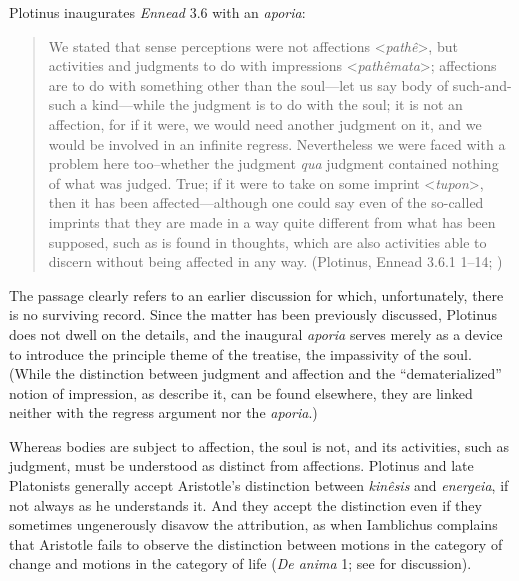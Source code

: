 \documentclass[12pt]{article}
\begin{document}
Plotinus inaugurates \emph{Ennead} 3.6 with an \emph{aporia}:
\begin{quote}
	We stated that sense perceptions were not affections <\emph{pathê}>, but activities and judgments to do with impressions <\emph{pathêmata}>; affections are to do with something other than the soul---let us say body of such-and-such a kind---while the judgment is to do with the soul; it is not an affection, for if it were, we would need another judgment on it, and we would be involved in an infinite regress. Nevertheless we were faced with a problem here too--whether the judgment \emph{qua} judgment contained nothing of what was judged. True; if it were to take on some imprint <\emph{tupon}>, then it has been affected---although one could say even of the so-called imprints that they are made in a way quite different from what has been supposed, such as is found in thoughts, which are also activities able to discern without being affected in any way. (Plotinus, Ennead 3.6.1 1--14; \citealt[3]{Fleet:1995gf})
\end{quote}
The passage clearly refers to an earlier discussion for which, unfortunately, there is no surviving record. Since the matter has been previously discussed, Plotinus does not dwell on the details, and the inaugural \emph{aporia} serves merely as a device to introduce the principle theme of the treatise, the impassivity of the soul. (While the distinction between judgment and affection and the ``dematerialized'' notion of impression, as \citealt[292]{Dillon:2015yf} describe it, can be found elsewhere, they are linked neither with the regress argument nor the \emph{aporia}.) 

Whereas bodies are subject to affection, the soul is not, and its activities, such as judgment, must be understood as distinct from affections. Plotinus and late Platonists generally accept Aristotle's distinction between \emph{kinêsis} and \emph{energeia}, if not always as he understands it. And they accept the distinction even if they sometimes ungenerously disavow the attribution, as when Iamblichus complains that Aristotle fails to observe the distinction between motions in the category of change and motions in the category of life (\emph{De anima} 1; see \citealt[76--77]{Finamore:2002yf} for discussion). 
\end{document}
